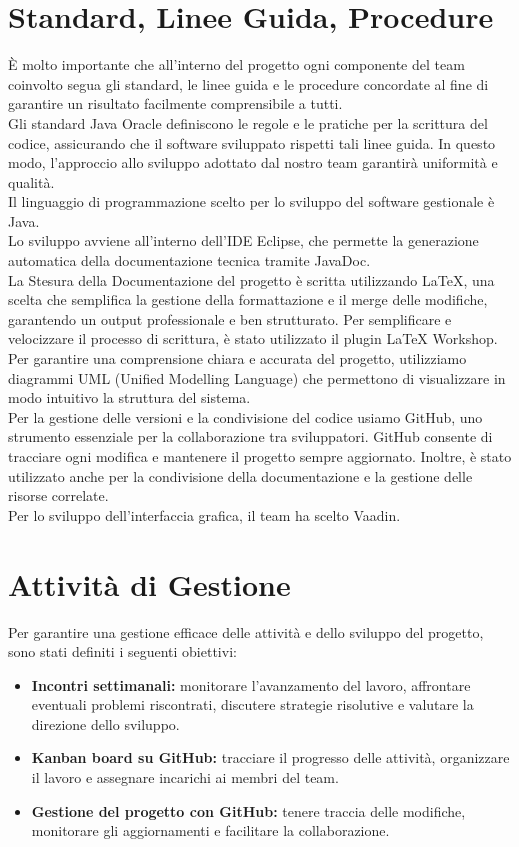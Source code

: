 \documentclass[a4paper,12pt]{article}
\begin{document}
\section{Standard, Linee Guida, Procedure} %
È molto importante che all’interno del progetto ogni componente del team coinvolto segua gli standard, le linee guida e le procedure concordate al fine di garantire un risultato facilmente comprensibile a tutti. \\
Gli standard Java Oracle definiscono le regole e le pratiche per la scrittura del codice, assicurando che il software sviluppato rispetti tali linee guida. In questo modo, l'approccio allo sviluppo adottato dal nostro team garantirà uniformità e qualità.\\
Il linguaggio di programmazione scelto per lo sviluppo del software gestionale è Java.\\
Lo sviluppo avviene all'interno dell'IDE Eclipse, che permette la generazione automatica della documentazione tecnica tramite JavaDoc.\\
La Stesura della Documentazione del progetto è scritta utilizzando LaTeX, una scelta che semplifica la gestione della formattazione e il merge delle modifiche, garantendo un output professionale e ben strutturato. Per semplificare e velocizzare il processo di scrittura, è stato utilizzato il plugin LaTeX Workshop.\\
Per garantire una comprensione chiara e accurata del progetto, utilizziamo diagrammi UML (Unified Modelling Language) che permettono di visualizzare in modo intuitivo la struttura del sistema.\\
Per la gestione delle versioni e la condivisione del codice usiamo GitHub, uno strumento essenziale per la collaborazione tra sviluppatori. GitHub consente di tracciare ogni modifica e mantenere il progetto sempre aggiornato. Inoltre, è stato utilizzato anche per la condivisione della documentazione e la gestione delle risorse correlate.\\
Per lo sviluppo dell'interfaccia grafica, il team ha scelto Vaadin.

\section{Attività di Gestione} %
Per garantire una gestione efficace delle attività e dello sviluppo del progetto, sono stati definiti i seguenti obiettivi:
\begin{itemize}
    \item \textbf{Incontri settimanali:} monitorare l’avanzamento del lavoro, affrontare eventuali problemi riscontrati, discutere strategie risolutive e valutare la direzione dello sviluppo.
    \item \textbf{Kanban board su GitHub:} tracciare il progresso delle attività, organizzare il lavoro e assegnare incarichi ai membri del team.
    \item \textbf{Gestione del progetto con GitHub:} tenere traccia delle modifiche, monitorare gli aggiornamenti e facilitare la collaborazione.
\end{itemize}
\end{document}
